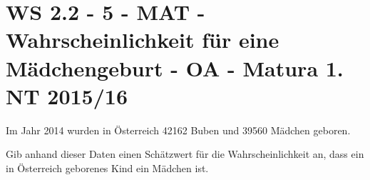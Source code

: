 \section{WS 2.2 - 5 - MAT - Wahrscheinlichkeit für eine Mädchengeburt - OA - Matura 1. NT 2015/16}

\begin{beispiel}{1} %
	Im Jahr 2014 wurden in Österreich 42162 Buben und 39560 Mädchen geboren. \leer
	
	Gib anhand dieser Daten einen Schätzwert für die Wahrscheinlichkeit an, dass ein in Österreich geborenes Kind ein Mädchen ist. 

	
\end{beispiel}